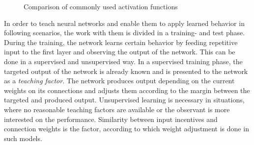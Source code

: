 \documentclass[10pt,a4paper,DIV=11]{scrreprt}
\begin{document}
\begin{figure}
\centering
{}


	
\caption{Comparison of commonly used activation functions}
\label{fig:plots}
\end{figure}

In order to teach neural networks and enable them to apply learned behavior in following scenarios, the work with them is divided in a training- and test phase. During the training, the network learns certain behavior by feeding repetitive input to the first layer and observing the output of the network. This can be done in a supervised and unsupervised way. In a supervised training phase, the targeted output of the network is already known and is presented to the network as a \textit{teaching factor}. The network produces output depending on the current weights on its connections and adjusts them according to the margin between the targeted and produced output. Unsupervised learning is necessary in situations, where no reasonable teaching factors are available or the observant is more interested on the performance. Similarity between input incentives and connection weights is the factor, according to which weight adjustment is done in such models.
\end{document}

